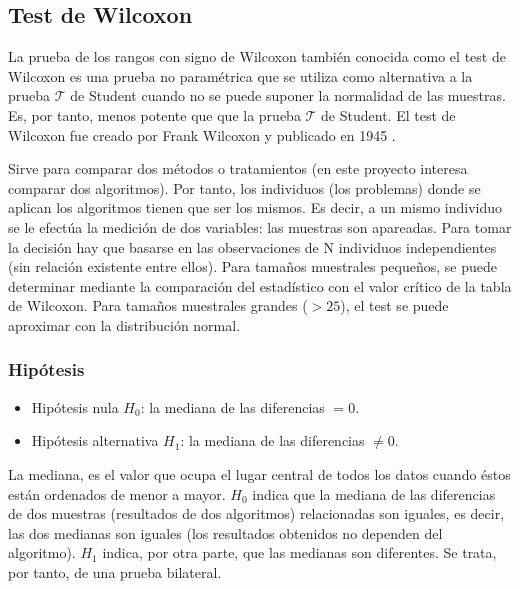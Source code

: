 
\subsection{Test de Wilcoxon}
La prueba de los rangos con signo de Wilcoxon también conocida como el test de Wilcoxon es una prueba no
paramétrica que se utiliza como alternativa a la prueba $\mathcal{T}$ de Student cuando no se puede suponer la normalidad
de las muestras. Es, por tanto, menos potente que que la prueba $\mathcal{T}$ de Student. El test de Wilcoxon fue creado
por Frank Wilcoxon y publicado en 1945 \cite{wilcoxon}.

Sirve para comparar dos métodos o tratamientos (en este proyecto interesa comparar dos algoritmos). Por tanto,
los individuos (los problemas) donde se aplican los algoritmos tienen que ser los mismos. Es decir, a un mismo
individuo se le efectúa la medición de dos variables: las muestras son apareadas. Para tomar la decisión hay
que basarse en las observaciones de N individuos independientes (sin relación existente entre ellos). Para tamaños
muestrales pequeños, se puede determinar mediante la comparación del estadístico con el valor crítico de la
tabla de Wilcoxon. Para tamaños muestrales grandes ($> 25$), el test se puede aproximar con la distribución normal.

\subsubsection{Hipótesis}
\begin{itemize}
\item Hipótesis nula $H_0$: la mediana de las diferencias $ = 0$.
\item Hipótesis alternativa $H_1$: la mediana de las diferencias $ \neq 0$.
\end{itemize}
La mediana, es el valor que ocupa el lugar central de todos los datos cuando éstos están ordenados de menor a
mayor. $H_0$ indica que la mediana de las diferencias de dos muestras (resultados de dos algoritmos) relacionadas
son iguales, es decir, las dos medianas son iguales (los resultados obtenidos no dependen del algoritmo).
$H_1$ indica, por otra parte, que las medianas son diferentes. Se trata, por tanto, de una prueba bilateral.

